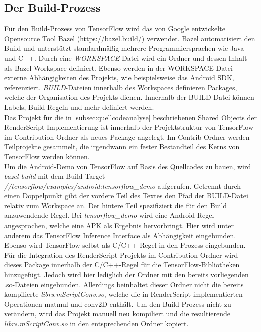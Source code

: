 \subsection{Der Build-Prozess}
\label{subsec:buildprozess}
Für den Build-Prozess von TensorFlow wird das von Google entwickelte Opensource Tool Bazel (\url{https://bazel.build/}) verwendet. Bazel automatisiert den Build und unterstützt standardmäßig mehrere Programmiersprachen wie Java und C++. Durch eine \textit{WORKSPACE}-Datei wird ein Ordner und dessen Inhalt als Bazel Workspace definiert. Ebenso werden in der WORKSPACE-Datei externe Abhängigkeiten des Projekts, wie beispielsweise das Android SDK, referenziert. \textit{BUILD}-Dateien innerhalb des Workspaces definieren Packages, welche der Organisation des Projekts dienen. Innerhalb der BUILD-Datei können Labels, Build-Regeln und mehr definiert werden. 
\\
Das Projekt für die in \ref{subsec:quellcodeanalyse} beschriebenen Shared Objects der RenderScript-Implementierung ist innerhalb der Projektstruktur von TensorFlow im Contribution-Ordner als neues Package angelegt. Im Contrib-Ordner werden Teilprojekte gesammelt, die irgendwann ein fester Bestandteil des Kerns von TensorFlow werden können. 
\\
Um die Android-Demo von TensorFlow auf Basis des Quellcodes zu bauen, wird \textit{bazel build} mit dem Build-Target \textit{//tensorflow/examples/android:tensorflow\_demo} aufgerufen. Getrennt durch einen Doppelpunkt gibt der vordere Teil des Textes den Pfad der BUILD-Datei relativ zum Workspace an. Der hintere Teil spezifiziert die für den Build anzuwendende Regel. Bei \textit{tensorflow\_demo} wird eine Android-Regel angesprochen, welche eine APK als Ergebnis hervorbringt. Hier wird unter anderem das TensorFlow Inference Interface als Abhängigkeit eingebunden. Ebenso wird TensorFlow selbst als C/C++-Regel in den Prozess eingebunden. Für die Integration des RenderScript-Projekts im Contribution-Ordner wird dieses Package innerhalb der C/C++-Regel für die TensorFlow-Bibliotheken hinzugefügt. Jedoch wird hier lediglich der Ordner mit den bereits vorliegenden .so-Dateien eingebunden. Allerdings beinhaltet dieser Ordner nicht die bereits kompilierte \textit{librs.mScriptConv.so}, welche die in RenderScript implementierten Operationen matmul und conv2D enthält. Um den Build-Prozess nicht zu verändern, wird das Projekt manuell neu kompiliert und die resultierende \textit{librs.mScriptConv.so} in den entsprechenden Ordner kopiert. 
